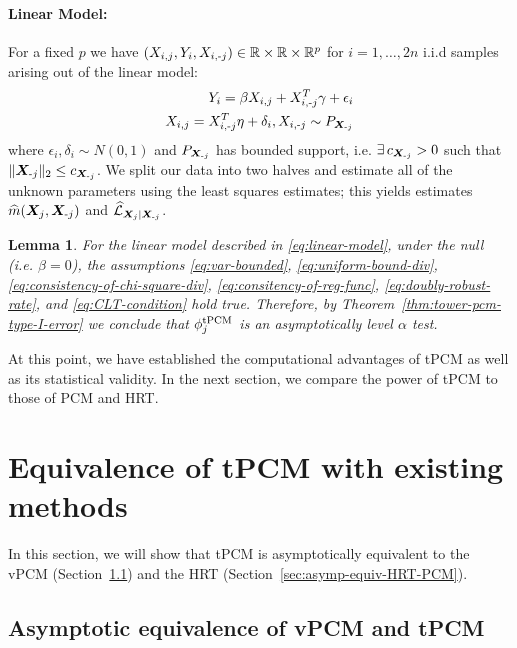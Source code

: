 \documentclass[12pt]{article}
\newtheorem{lemma}{Lemma}
\theoremstyle{definition}
\theoremstyle{remark}
\newcommand{\R}{\mathbb{R}}								%
\newcommand{\prx}{\bm X}								%
\newcommand{\srx}{X}									%
\newcommand{\sry}{Y}									%
\newcommand{\lawhat}{\widehat{\mathcal L}}				%
\newcommand{\minus}{\textnormal{-}} 						    %
\begin{document}
\paragraph{Linear Model:} For a fixed $p$ we have $(\srx_{i,j},\sry_i,\srx_{i,\minus j}) \in \R \times \R \times \R^p$ for $i=1,\ldots,2n$ i.i.d samples arising out of the linear model:
\begin{align}\label{eq:linear-model}
	\begin{split}
		\sry_i = \beta \srx_{i,j} + \srx_{i,\minus j}^T \gamma + \epsilon_i \\
		\srx_{i,j} = \srx_{i,\minus j}^T\eta + \delta_i, \srx_{i,\minus j}\sim P_{\prx_{\minus j}} 
	\end{split}	
\end{align}
where $\epsilon_i,\delta_i \sim N(0,1)$ and $P_{\prx_{\minus j}}$ has bounded support, i.e. $\exists\, c_{\prx_{\minus j}} >0$ such that $\|\prx_{\minus j}\|_2 \leq c_{\prx_{\minus j}}$. We split our data into two halves and estimate all of the unknown parameters using the least squares estimates; this yields estimates $\widehat m(\prx_j,\prx_{\minus j})$ and $\lawhat_{\prx_j|\prx_{\minus j}}$.
\begin{lemma}\label{lemma:linear-model-type-I-error}
	For the linear model described in \eqref{eq:linear-model}, under the null (i.e. $\beta = 0$), the assumptions \eqref{eq:var-bounded}, \eqref{eq:uniform-bound-div}, \eqref{eq:consistency-of-chi-square-div}, \eqref{eq:consitency-of-reg-func}, \eqref{eq:doubly-robust-rate}, and \eqref{eq:CLT-condition} hold true. Therefore, by Theorem~\ref{thm:tower-pcm-type-I-error} we conclude that $\phi_j^{\textnormal{tPCM}}$ is an asymptotically level $\alpha$ test.
\end{lemma}
At this point, we have established the computational advantages of tPCM as well as its statistical validity. In the next section, we compare the power of tPCM to those of PCM and HRT.

\section{Equivalence of tPCM with existing methods}\label{sec:asym-equiv-tower-PCM}

In this section, we will show that tPCM is asymptotically equivalent to the vPCM (Section~\ref{sec:asymp-equivalence-vPCM-tPCM}) and the HRT (Section~\ref{sec:asymp-equiv-HRT-PCM}).

\subsection{Asymptotic equivalence of vPCM and tPCM} \label{sec:asymp-equivalence-vPCM-tPCM}
\end{document}
